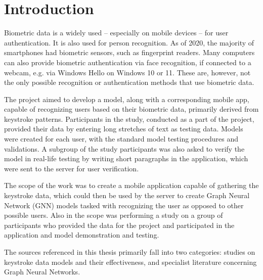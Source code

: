 
\chapter{Introduction}

Biometric data is a widely used -- especially on mobile devices -- for user authentication. It is also used for person recognition. As of 2020, the majority of smartphones had biometric sensors, such as fingerprint readers. \cite{statista_biometric_phones_2025} Many computers can also provide biometric authentication via face recognition, if connected to a webcam, e.g. via Windows Hello on Windows 10 or 11. \cite{microsoft_windows_hello_2025} These are, however, not the only possible recognition or authentication methods that use biometric data.

The project aimed to develop a model, along with a corresponding mobile app, capable of recognizing users based on their biometric data, primarily derived from keystroke patterns. Participants in the study, conducted as a part of the project, provided their data by entering long stretches of text as testing data. Models were created for each user, with the standard model testing procedures and validations. A subgroup of the study participants was also asked to verify the model in real-life testing by writing short paragraphs in the application, which were sent to the server for user verification.

The scope of the work was to create a mobile application capable of gathering the keystroke data, which could then be used by the server to create Graph Neural Network (GNN) models tasked with recognizing the user as opposed to other possible users. Also in the scope was performing a study on a group of participants who provided the data for the project and participated in the application and model demonstration and testing.

The sources referenced in this thesis primarily fall into two categories: studies on keystroke data models and their effectiveness, and specialist literature concerning Graph Neural Networks.

